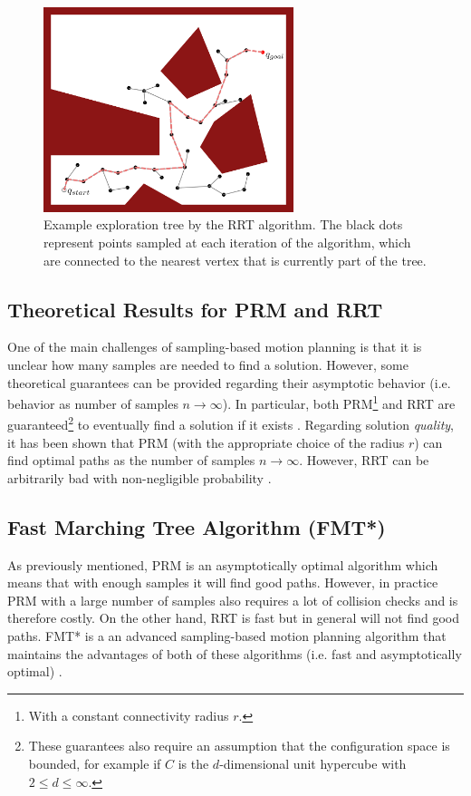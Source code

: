 \begin{figure}[ht]
  \centering
  \includegraphics[width=0.65\textwidth]{tex/figs/ch07_figs/rrt.png}
  \caption{Example exploration tree by the RRT algorithm. The black dots represent points sampled at each iteration of the algorithm, which are connected to the nearest vertex that is currently part of the tree.}
  \label{fig:rrt-graph}
\end{figure}

\subsection{Theoretical Results for PRM and RRT}
One of the main challenges of sampling-based motion planning is that it is unclear how many samples are needed to find a solution. However, some theoretical guarantees can be provided regarding their asymptotic behavior (i.e. behavior as number of samples $n \xrightarrow{} \infty$). In particular, both PRM\footnote[][-8\baselineskip]{With a constant connectivity radius $r$.} and RRT are guaranteed\footnote[][-8\baselineskip]{These guarantees also require an assumption that the configuration space is bounded, for example if $C$ is the $d$-dimensional unit hypercube with $2 \leq d \leq \infty$.} to eventually find a solution if it exists \cite[-4\baselineskip]{LaValle1998}\cite[-\baselineskip]{KavrakiSvestkaEtAl1996}.
Regarding solution \textit{quality}, it has been shown that PRM (with the appropriate choice of the radius $r$) can find optimal paths as the number of samples $n \xrightarrow{} \infty$. However, RRT can be arbitrarily bad with non-negligible probability \cite{KaramanFrazzoli2011}.

\subsection{Fast Marching Tree Algorithm (FMT*)}
As previously mentioned, PRM is an asymptotically optimal algorithm which means that with enough samples it will find good paths. However, in practice PRM with a large number of samples also requires a lot of collision checks and is therefore costly. On the other hand, RRT is fast but in general will not find good paths.
FMT* is a an advanced sampling-based motion planning algorithm that maintains the advantages of both of these algorithms (i.e. fast and asymptotically optimal) \cite{JansonSchmerlingEtAl2015}.

